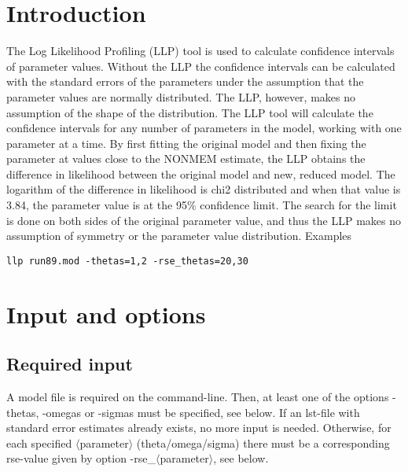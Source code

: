 



\maketitle


\section{Introduction}
The Log Likelihood Profiling (LLP) tool is used to calculate confidence intervals of parameter values. Without the LLP the confidence intervals can be calculated with the standard errors of the parameters under the assumption that the parameter values are normally distributed. The LLP, however, makes no assumption of the shape of the distribution.
The LLP tool will calculate the confidence intervals for any number of parameters in the model, working with one parameter at a time. By first fitting the original model and then fixing the parameter at values close to the NONMEM estimate, the LLP obtains the difference in likelihood between the original model and new, reduced model. The logarithm of the difference in likelihood is chi2 distributed and when that value is 3.84, the parameter value is at the 95\% confidence limit. The search for the limit is done on both sides of the original parameter value, and thus the LLP makes no assumption of symmetry or the parameter value distribution.
Examples
\begin{verbatim}
llp run89.mod -thetas=1,2 -rse_thetas=20,30
\end{verbatim}

\section{Input and options}

\subsection{Required input}
A model file is required on the command-line. Then, at least one of the options -thetas, -omegas or -sigmas must be specified, see below. If an lst-file with standard error estimates already exists, no more input is needed. Otherwise, for each specified $\langle$parameter$\rangle$ (theta/omega/sigma) there must be a corresponding rse-value given by option -rse\_$\langle$parameter$\rangle$, see below. 

